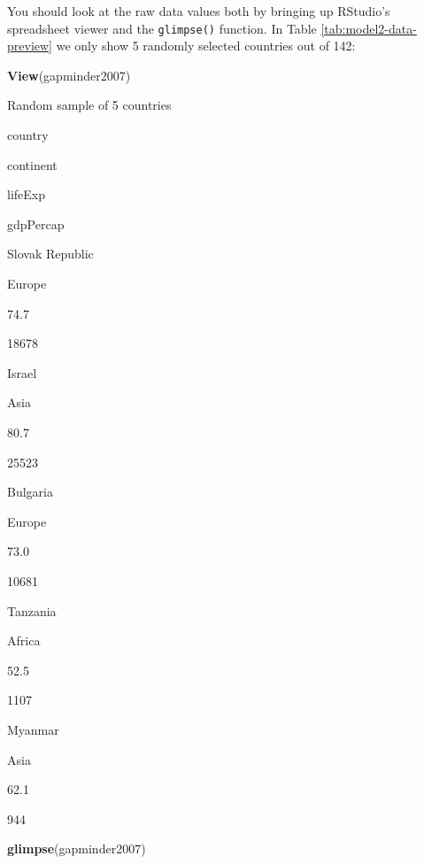 \documentclass[12pt,]{krantz}
\makeatletter
\newenvironment{Shaded}{\begin{snugshade}}{\end{snugshade}}
\newcommand{\KeywordTok}[1]{\textcolor[rgb]{0.27,0.27,0.27}{\textbf{#1}}}
\newcommand{\DecValTok}[1]{\textcolor[rgb]{0.06,0.06,0.06}{#1}}
\newcommand{\StringTok}[1]{\textcolor[rgb]{0.5,0.5,0.5}{#1}}
\newcommand{\OperatorTok}[1]{\textcolor[rgb]{0.43,0.43,0.43}{\textbf{#1}}}
\newcommand{\NormalTok}[1]{#1}
\newenvironment{kframe}{%
\medskip{}
\setlength{\fboxsep}{.8em}
 \def\at@end@of@kframe{}%
 \ifinner\ifhmode%
  \def\at@end@of@kframe{\end{minipage}}%
  \begin{minipage}{\columnwidth}%
 \fi\fi%
 \def\FrameCommand##1{\hskip\@totalleftmargin \hskip-\fboxsep
 \colorbox{shadecolor}{##1}\hskip-\fboxsep
     \hskip-\linewidth \hskip-\@totalleftmargin \hskip\columnwidth}%
 \MakeFramed {\advance\hsize-\width
   \@totalleftmargin\z@ \linewidth\hsize
   \@setminipage}}%
 {\par\unskip\endMakeFramed%
 \at@end@of@kframe}
\renewenvironment{Shaded}{\begin{kframe}}{\end{kframe}}
\makeatother
\begin{document}
\begin{Shaded}
\end{Shaded}

You should look at the raw data values both by bringing up RStudio's
spreadsheet viewer and the \texttt{glimpse()} function. In Table
\ref{tab:model2-data-preview} we only show 5 randomly selected countries
out of 142:

\begin{Shaded}
\begin{Highlighting}[]
\KeywordTok{View}\NormalTok{(gapminder2007)}
\end{Highlighting}
\end{Shaded}

\label{tab:model2-data-preview}Random sample of 5 countries

country

continent

lifeExp

gdpPercap

Slovak Republic

Europe

74.7

18678

Israel

Asia

80.7

25523

Bulgaria

Europe

73.0

10681

Tanzania

Africa

52.5

1107

Myanmar

Asia

62.1

944

\begin{Shaded}
\begin{Highlighting}[]
\KeywordTok{glimpse}\NormalTok{(gapminder2007)}
\end{Highlighting}
\end{Shaded}
\end{document}
